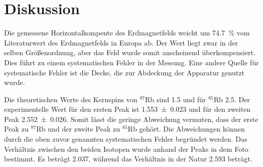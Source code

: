 \section{Diskussion}
\label{sec:Diskussion}

Die gemessene Horizontalkompente des Erdmagnetfelds weicht um \SI{74.7}{\percent} vom Literaturwert des Erdmagnetfelds in Europa ab.
Der Wert liegt zwar in der selben Größenordnung, aber das Feld wurde somit anscheinend überkompensiert. 
Dies führt zu einem systematischen Fehler in der Messung. Eine andere Quelle für systematische Fehler ist die Decke, die zur Abdeckung der Apparatur genutzt wurde.

Die theoretischen Werte des Kernspins von $^{87}$Rb sind \num{1.5} und für $^{85}$Rb \num{2.5}.
Der experimentelle Wert für den ersten Peak ist \num{1.553(23)} und für den zweiten Peak \num{2.552(26)}. Somit lässt die geringe Abweichung vermuten, dass der erste Peak zu $^{87}$Rb und der zweite Peak zu $^{85}$Rb gehört. 
Die Abweichungen können durch die oben zuvor genannten systematischen Fehler begründet werden. 
Das Verhältnis zwischen den beiden Isotopen wurde anhand der Peaks in dem Foto bestimmt. 
Es beträgt \num{2.037}, während das Verhältnis in der Natur \num{2.593} beträgt. 


